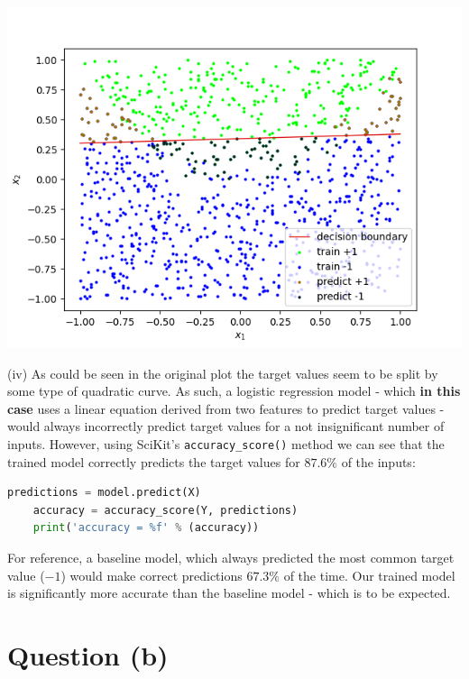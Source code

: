 \documentclass[12pt]{article}
\begin{document}
\begin{center}
    \includegraphics[scale=0.8]{fig_2.png}
\end{center}

\noindent (iv) As could be seen in the original plot the target values seem to be split by some type of quadratic curve. As such, a logistic regression model - which \textbf{in this case} uses a linear equation derived from two features to predict target values - would always incorrectly predict target values for a not insignificant number of inputs. However, using SciKit's \texttt{accuracy\_score()} method we can see that the trained model correctly predicts the target values for $87.6\%$ of the inputs:

\begin{center}
    \lstset{basicstyle=\footnotesize}
    \begin{lstlisting}[language=Python]
    predictions = model.predict(X)
    accuracy = accuracy_score(Y, predictions)
    print('accuracy = %f' % (accuracy))
    \end{lstlisting}
\end{center}

For reference, a baseline model, which always predicted the most common target value ($-1$) would make correct predictions $67.3\%$ of the time. Our trained model is significantly more accurate than the baseline model - which is to be expected.

\section*{Question (b)}
\end{document}
